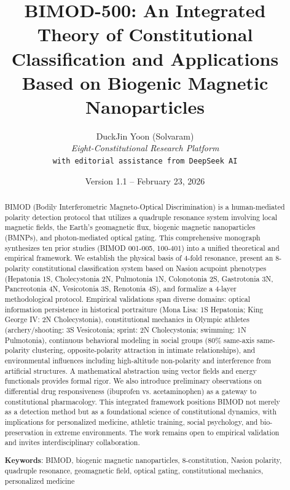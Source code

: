 \documentclass[12pt,a4paper]{article}
\title{BIMOD-500: An Integrated Theory of Constitutional Classification and Applications \\ 
\large Based on Biogenic Magnetic Nanoparticles}
\author{
DuckJin Yoon (Solvaram) \\
\textit{Eight-Constitutional Research Platform} \\
\texttt{with editorial assistance from DeepSeek AI}
}
\date{Version 1.1 -- February 23, 2026}
\begin{document}
\maketitle

\begin{abstract}
BIMOD (Bodily Interferometric Magneto-Optical Discrimination) is a human-mediated polarity detection protocol that utilizes a quadruple resonance system involving local magnetic fields, the Earth's geomagnetic flux, biogenic magnetic nanoparticles (BMNPs), and photon-mediated optical gating. This comprehensive monograph synthesizes ten prior studies (BIMOD 001-005, 100-401) into a unified theoretical and empirical framework. We establish the physical basis of 4-fold resonance, present an 8-polarity constitutional classification system based on Nasion acupoint phenotypes (Hepatonia 1S, Cholecystonia 2N, Pulmotonia 1N, Colonotonia 2S, Gastrotonia 3N, Pancreotonia 4N, Vesicotonia 3S, Renotonia 4S), and formalize a 4-layer methodological protocol. Empirical validations span diverse domains: optical information persistence in historical portraiture (Mona Lisa: 1S Hepatonia; King George IV: 2N Cholecystonia), constitutional mechanics in Olympic athletes (archery/shooting: 3S Vesicotonia; sprint: 2N Cholecystonia; swimming: 1N Pulmotonia), continuous behavioral modeling in social groups (80\% same-axis same-polarity clustering, opposite-polarity attraction in intimate relationships), and environmental influences including high-altitude non-polarity and interference from artificial structures. A mathematical abstraction using vector fields and energy functionals provides formal rigor. We also introduce preliminary observations on differential drug responsiveness (ibuprofen vs. acetaminophen) as a gateway to constitutional pharmacology. This integrated framework positions BIMOD not merely as a detection method but as a foundational science of constitutional dynamics, with implications for personalized medicine, athletic training, social psychology, and bio-preservation in extreme environments. The work remains open to empirical validation and invites interdisciplinary collaboration.

\textbf{Keywords}: BIMOD, biogenic magnetic nanoparticles, 8-constitution, Nasion polarity, quadruple resonance, geomagnetic field, optical gating, constitutional mechanics, personalized medicine
\end{abstract}

\tableofcontents

\end{document}
